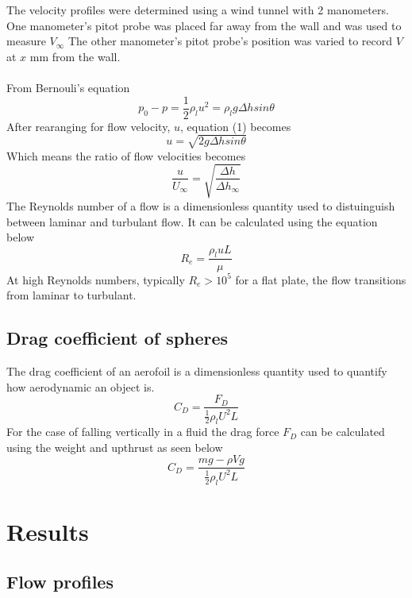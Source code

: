 \documentclass{article}
\begin{document}
The velocity profiles were determined using a wind tunnel with 2 manometers.
One manometer's pitot probe was placed far away from the wall and was used to measure $V_\infty$
The other manometer's pitot probe's position was varied to record $V$ at $x$ mm from the wall. \\ \\
From Bernouli's equation
\begin{equation}
    p_0 - p = \frac{1}{2}\rho_l u^2 = \rho_l g \Delta h sin \theta
\end{equation}
After rearanging for flow velocity, $u$, equation (1) becomes
\begin{equation}
    u = \sqrt{2 g \Delta h sin \theta}
\end{equation}
Which means the ratio of flow velocities becomes
\begin{equation}
    \frac{u}{U_\infty} = \sqrt{\frac{\Delta h}{\Delta h_\infty}}
\end{equation}
The Reynolds number of a flow is a dimensionless quantity used to distuinguish between laminar and turbulant flow.
It can be calculated using the equation below
\begin{equation}
    R_e = \frac{\rho_l u L}{\mu}
\end{equation}
At high Reynolds numbers, typically $R_e > 10^5$ for a flat plate, the flow transitions from laminar to turbulant.

\subsection{Drag coefficient of spheres}

The drag coefficient of an aerofoil is a dimensionless quantity used to quantify how aerodynamic an object is.
\begin{equation}
    C_D = \frac{F_D}{\frac{1}{2}\rho_l U^2 L}
\end{equation}
For the case of falling vertically in a fluid the drag force $F_D$ can be calculated using the weight and upthrust as seen below
\begin{equation}
    C_D = \frac{mg - \rho V g}{\frac{1}{2}\rho_l U^2 L}
\end{equation}

\section{Results}


\subsection{Flow profiles}
\end{document}
